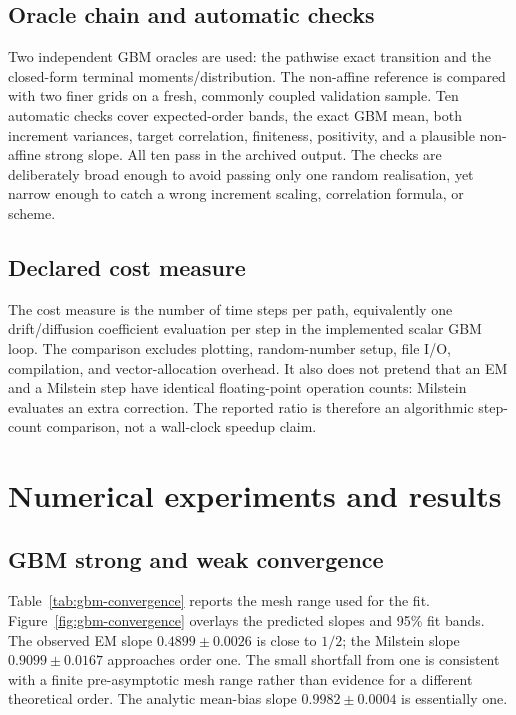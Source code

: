 \documentclass[11pt,a4paper]{article}
\theoremstyle{definition}
\theoremstyle{remark}
\begin{document}
\subsection{Oracle chain and automatic checks}
Two independent GBM oracles are used: the pathwise exact transition and the
closed-form terminal moments/distribution.  The non-affine reference is compared
with two finer grids on a fresh, commonly coupled validation sample.  Ten automatic checks cover expected-order
bands, the exact GBM mean, both increment variances, target correlation,
finiteness, positivity, and a plausible non-affine strong slope.  All ten pass
in the archived output.  The checks are deliberately broad enough to avoid
passing only one random realisation, yet narrow enough to catch a wrong
increment scaling, correlation formula, or scheme.

\subsection{Declared cost measure}
The cost measure is the number of time steps per path, equivalently one
drift/diffusion coefficient evaluation per step in the implemented scalar GBM
loop.  The comparison excludes plotting, random-number setup, file I/O,
compilation, and vector-allocation overhead.  It also does not pretend that an
EM and a Milstein step have identical floating-point operation counts: Milstein
evaluates an extra correction.  The reported ratio is therefore an algorithmic
step-count comparison, not a wall-clock speedup claim.

\section{Numerical experiments and results}\label{sec:results}

\subsection{GBM strong and weak convergence}
Table~\ref{tab:gbm-convergence} reports the mesh range used for the
fit.  Figure~\ref{fig:gbm-convergence} overlays the predicted slopes and 95\%
fit bands.  The observed EM slope $0.4899\pm0.0026$ is close to $1/2$; the
Milstein slope $0.9099\pm0.0167$ approaches order one.  The small shortfall from
one is consistent with a finite pre-asymptotic mesh range rather than evidence
for a different theoretical order.  The analytic mean-bias slope
$0.9982\pm0.0004$ is essentially one.
\end{document}
